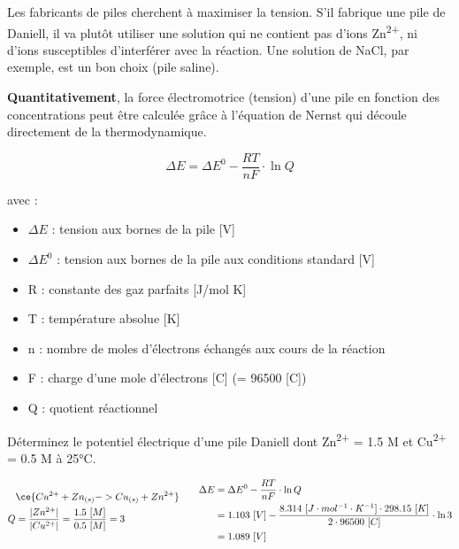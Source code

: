 \documentclass[
  11pt,
  a4paper,
  openany]{book}
\providecommand{\tightlist}{%
  \setlength{\itemsep}{0pt}\setlength{\parskip}{0pt}}
\begin{document}
Les fabricants de piles cherchent à maximiser la tension. S'il fabrique une pile de Daniell, il va plutôt utiliser une solution qui ne contient pas d'ions Zn\textsuperscript{2+}, ni d'ions susceptibles d'interférer avec la réaction. Une solution de NaCl, par exemple, est un bon choix (pile saline).

\textbf{Quantitativement}, la force électromotrice (tension) d'une pile en fonction des concentrations peut être calculée grâce à l'équation de Nernst qui découle directement de la thermodynamique.

\[
\Delta E = \Delta E^{0} - \frac{RT}{nF} \cdot \ln{Q}
\]

avec :

\begin{itemize}
\tightlist
\item
  \(\Delta E\) : tension aux bornes de la pile {[}V{]}
\item
  \(\Delta E^{0}\) : tension aux bornes de la pile aux conditions standard {[}V{]}
\item
  R : constante des gaz parfaits {[}J/mol K{]}
\item
  T : température absolue {[}K{]}
\item
  n : nombre de moles d'électrons échangés aux cours de la réaction
\item
  F : charge d'une mole d'électrons {[}C{]} (= 96500 {[}C{]})
\item
  Q : quotient réactionnel
\end{itemize}

\clearpage

\begin{Exercise}

Déterminez le potentiel électrique d'une pile Daniell dont \textbar Zn\textsuperscript{2+}\textbar{} = 1.5 M et \textbar Cu\textsuperscript{2+}\textbar{} = 0.5 M à 25°C.


\end{Exercise}

\begin{Answer}
\[
\begin{split}
  & \ce{Cu^{2+} + Zn_{(s)} -> Cu_{(s)} + Zn^{2+}} \\
  Q &= \frac{|Zn^{2+}|}{|Cu^{2+}|} = \frac{1.5\ [M]}{0.5\ [M]} = 3
\end{split}
\qquad
\begin{split}
  \Delta E &= \Delta E^{0} - \frac{RT}{nF} \cdot \ln{Q} \\
  &= 1.103\ [V] - \frac{8.314\ [J \cdot mol^{-1} \cdot K^{-1}] \cdot 298.15\ [K]}{2 \cdot 96500\ [C]} \cdot \ln{3} \\
  &= 1.089\ [V]
\end{split}
\]

\end{Answer}
\end{document}
